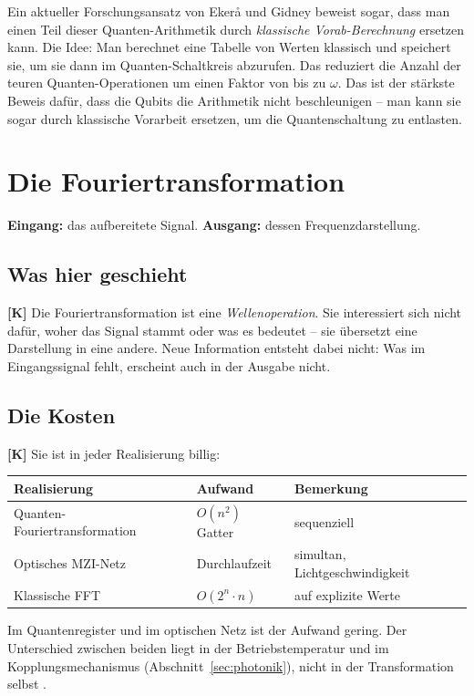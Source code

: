 Ein aktueller Forschungsansatz von Ekerå und Gidney \cite{Ekera2023}
beweist sogar, dass man einen Teil dieser Quanten-Arithmetik durch
\emph{klassische Vorab-Berechnung} ersetzen kann. Die Idee: Man berechnet
eine Tabelle von Werten klassisch und speichert sie, um sie dann im
Quanten-Schaltkreis abzurufen. Das reduziert die Anzahl der teuren
Quanten-Operationen um einen Faktor von bis zu $\omega$. Das ist der
stärkste Beweis dafür, dass die Qubits die Arithmetik nicht
beschleunigen -- man kann sie sogar durch klassische Vorarbeit ersetzen,
um die Quantenschaltung zu entlasten.

\section{Die Fouriertransformation}
\label{sec:ft}

\textbf{Eingang:} das aufbereitete Signal.
\textbf{Ausgang:} dessen Frequenzdarstellung.

\subsection{Was hier geschieht}

\textbf{[K]} Die Fouriertransformation ist eine \emph{Wellenoperation}.
Sie interessiert sich nicht dafür, woher das Signal stammt oder was
es bedeutet -- sie übersetzt eine Darstellung in eine andere. Neue
Information entsteht dabei nicht: Was im Eingangssignal fehlt,
erscheint auch in der Ausgabe nicht.

\subsection{Die Kosten}

\textbf{[K]} Sie ist in jeder Realisierung billig:

\begin{center}
\begin{tabular}{lll}
\toprule
Realisierung & Aufwand & Bemerkung \\
\midrule
Quanten-Fouriertransformation & $O(n^2)$ Gatter & sequenziell \\
Optisches MZI-Netz & Durchlaufzeit & simultan, Lichtgeschwindigkeit \\
Klassische FFT & $O(2^n \cdot n)$ & auf explizite Werte \\
\bottomrule
\end{tabular}
\end{center}

Im Quantenregister und im optischen Netz ist der Aufwand gering. Der
Unterschied zwischen beiden liegt in der Betriebstemperatur und im
Kopplungsmechanismus (Abschnitt~\ref{sec:photonik}), nicht in der
Transformation selbst \cite{Nielsen2010}.

